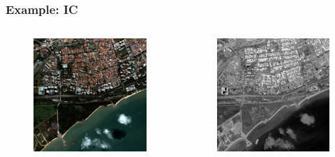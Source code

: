 \documentclass[compress]{beamer}
\begin{document}
\begin{frame}
\frametitle{Example: IC}
\begin{columns}
\begin{column}{0.5\textwidth}
\begin{figure}[]
  \includegraphics[width=1.0\textwidth]{radio2-extract-3b.jpg}
\end{figure}
\end{column}
\begin{column}{0.5\textwidth}
\begin{figure}[]
  \includegraphics[width=1.0\textwidth]{Radiometry-IC.jpg}
\end{figure}
\end{column}
\end{columns}
\end{frame}
\end{document}
